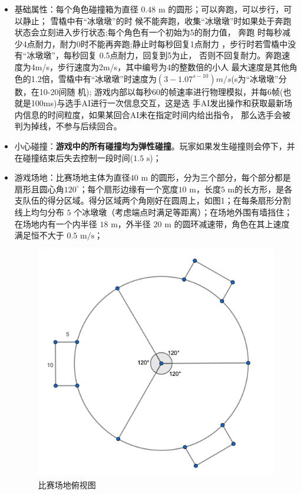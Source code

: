 \documentclass[UTF8]{article}
\begin{document}
\begin{itemize}
\item
  基础属性：每个角色碰撞箱为直径 \(0.48 \text{ m}\)
  的圆形；可以奔跑，可以步行，可以静止；
  雪橇中有“冰墩墩”的时 候不能奔跑，收集“冰墩墩”时如果处于奔跑状态会立刻进入步行状态;每个角色有一个初始为5的耐力值，
  奔跑 时每秒减少4点耐力，耐力0时不能再奔跑;静止时每秒回复1点耐力
  ，步行时若雪橇中没有“冰墩墩”，每秒回复 0.5点耐力，回复到5为止，
  否则不回复耐力。奔跑速度为4m/s，步行速度为2m/s，其中编号为4的整数倍的小人
  最大速度是其他角色的1.2倍，雪橇中有“冰墩墩”时速度为$(3−1.07^{s-10})m/s$(s为“冰墩墩”分数，在10-20间随 机);
  游戏内部以每秒60的帧速率进行物理模拟，并每6帧(也就是100ms)与选手AI进行一次信息交互，这是选
  手AI发出操作和获取最新场内信息的时间粒度，如果某回合AI未在指定时间内给出指令，
  那么选手会被判为掉线，不参与后续回合。

\item
  小心碰撞：\textbf{游戏中的所有碰撞均为弹性碰撞}。玩家如果发生碰撞则会停下，并在碰撞结束后失去控制一段时间(\(1.5\text{ s}\))；
\item
  游戏场地：比赛场地主体为直径\( 40\text{ m}\)
  的圆形，分为三个部分，每个部分都是扇形且圆心角\(120^\circ\)；每个扇形边缘有一个宽度\( 10\text{ m}\)，长度\( 5\text{ m} \)的长方形，是各支队伍的得分区域。得分区域两个角刚好在圆周上，如图1；在每条扇形分割线上均匀分布
  \(5\)
  个冰墩墩（考虑端点时满足等距离）；在场地外围有墙挡住；在场地内有一个内半径
  \(18\text{ m}\)，外半径 \(20\text{ m}\)
  的圆环减速带，角色在其上速度满足恒不大于 \(0.5\text{ m/s}\)；
  \begin{figure}[ht]

    \centering
    \includegraphics[scale=0.15]{ground.png}
    \caption{比赛场地俯视图}
    \end{figure}
\end{itemize}
\end{document}
